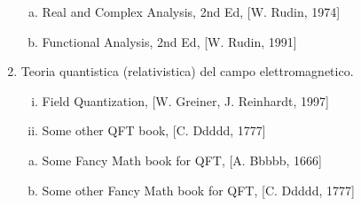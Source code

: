 \begin{enumerate}[I]
\begin{enumerate}[(a)]
\item Real and Complex Analysis, 2nd Ed, [W. Rudin, 1974]
\item Functional Analysis, 2nd Ed, [W. Rudin, 1991] 
\end{enumerate} 
\item Teoria quantistica (relativistica) del campo elettromagnetico. 
\begin{enumerate}[(i)]
\item Field Quantization, [W. Greiner, J. Reinhardt, 1997]
\item Some other QFT book, [C. Ddddd, 1777]
\end{enumerate} 
\begin{enumerate}[(a)]
\item Some Fancy Math book for QFT, [A. Bbbbb, 1666]
\item Some other Fancy Math book for QFT, [C. Ddddd, 1777]
\end{enumerate} 
\end{enumerate} 
 
